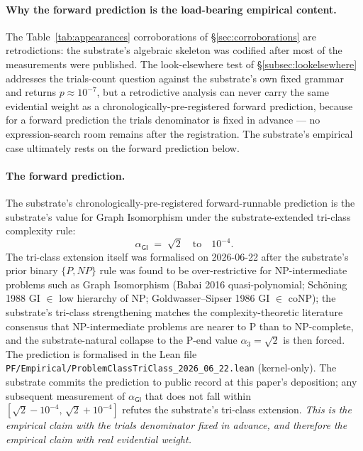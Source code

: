 \documentclass[11pt,a4paper]{amsart}
\theoremstyle{plain}
\theoremstyle{definition}
\begin{document}
\paragraph{Why the forward prediction is the load-bearing empirical content.} The Table~\ref{tab:appearances} corroborations of \S\ref{sec:corroborations} are retrodictions: the substrate's algebraic skeleton was codified after most of the measurements were published. The look-elsewhere test of \S\ref{subsec:lookelsewhere} addresses the trials-count question against the substrate's own fixed grammar and returns $p \approx 10^{-7}$, but a retrodictive analysis can never carry the same evidential weight as a chronologically-pre-registered forward prediction, because for a forward prediction the trials denominator is fixed in advance --- no expression-search room remains after the registration. The substrate's empirical case ultimately rests on the forward prediction below.

\paragraph{The forward prediction.} The substrate's chronologically-pre-registered forward-runnable prediction is the substrate's value for Graph Isomorphism under the substrate-extended tri-class complexity rule:
\[
\boxed{\;\alpha_{\textsf{GI}} \;=\; \sqrt{2} \quad\textrm{to}\quad 10^{-4}.\;}
\]
The tri-class extension itself was formalised on 2026-06-22 after the substrate's prior binary $\{P, NP\}$ rule was found to be over-restrictive for NP-intermediate problems such as Graph Isomorphism (Babai 2016 quasi-polynomial; Sch\"oning 1988 GI $\in$ low hierarchy of NP; Goldwasser--Sipser 1986 GI $\in$ coNP); the substrate's tri-class strengthening matches the complexity-theoretic literature consensus that NP-intermediate problems are nearer to P than to NP-complete, and the substrate-natural collapse to the P-end value $\alpha_3 = \sqrt{2}$ is then forced. The prediction is formalised in the Lean file \texttt{PF/Empirical/ProblemClassTriClass\_2026\_06\_22.lean} (kernel-only). The substrate commits the prediction to public record at this paper's deposition; any subsequent measurement of $\alpha_{\textsf{GI}}$ that does not fall within $[\sqrt{2} - 10^{-4},\,\sqrt{2} + 10^{-4}]$ refutes the substrate's tri-class extension. \emph{This is the empirical claim with the trials denominator fixed in advance, and therefore the empirical claim with real evidential weight.}
\end{document}
